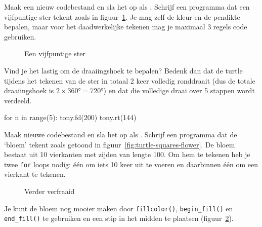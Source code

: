 \documentclass[../main]{subfiles}
\begin{document}
\begin{opgave}[icons={laptop}]
Maak een nieuw codebestand en sla het op als . Schrijf een programma dat een vijfpuntige ster tekent zoals in figuur~\ref{fig:turtle-star}. Je mag zelf de kleur en de pendikte bepalen, maar voor het daadwerkelijke tekenen mag je maximaal 3 regels code gebruiken.

\begin{figure}[ht]
    \centering
    \caption{Een vijfpuntige ster}%
    \label{fig:turtle-star}
\end{figure}

\begin{hints}
\item Vind je het lastig om de draaiingshoek te bepalen? Bedenk dan dat de turtle tijdens het tekenen van de ster in totaal 2 keer volledig ronddraait (dus de totale draaiingshoek is \(2 \times 360\unit{\degree} = 720\unit{\degree}\)) en dat die volledige draai over 5 stappen wordt verdeeld.
\end{hints}
\end{opgave}
\begin{antwoord}
\begin{python-breakable}[style=mu-noframe, numbers=none]
for n in range(5):
    tony.fd(200)
    tony.rt(144)
\end{python-breakable}
\end{antwoord}
\begin{opgave}[icons={laptop}]
Maak nieuwe codebestand en sla het op als . Schrijf een programma dat de `bloem' tekent zoals getoond in figuur~\ref{fig:turtle-squares-flower}. De bloem bestaat uit 10 vierkanten met zijden van lengte 100. Om hem te tekenen heb je twee \texttt{for} loops nodig: één om iets 10 keer uit te voeren en daarbinnen één om een vierkant te tekenen.

\begin{subfigures}
    \begin{figure}[ht]
        \begin{minipage}[c]{0.45\linewidth}
                \caption{Bloem van vierkanten}
                \label{fig:turtle-squares-flower}
        \end{minipage}
        \hfill
        \begin{minipage}[c]{0.45\linewidth}
                \caption{Verder verfraaid}
                \label{fig:turtle-squares-flower-2}
        \end{minipage}
    \end{figure}
\end{subfigures}

Je kunt de bloem nog mooier maken door \texttt{fillcolor()}, \texttt{begin\_fill()} en \texttt{end\_fill()} te gebruiken en een stip in het midden te plaatsen (figuur~\ref{fig:turtle-squares-flower-2}).
\end{opgave}
\end{document}
